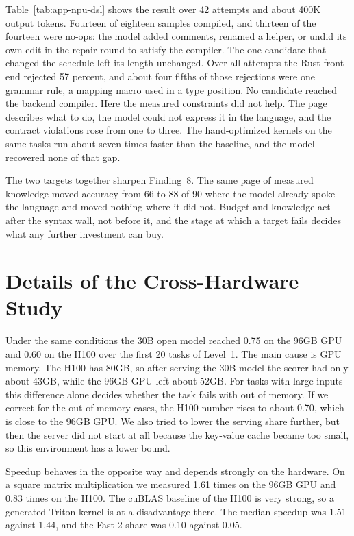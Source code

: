 Table~\ref{tab:app-npu-dsl} shows the result over 42 attempts and about 400K output tokens.
Fourteen of eighteen samples compiled, and thirteen of the fourteen were no-ops: the model added
comments, renamed a helper, or undid its own edit in the repair round to satisfy the compiler. The
one candidate that changed the schedule left its length unchanged. Over all attempts the Rust front
end rejected 57 percent, and about four fifths of those rejections were one grammar rule, a mapping
macro used in a type position. No candidate reached the backend compiler. Here the measured
constraints did not help. The page describes what to do, the model could not express it in the
language, and the contract violations rose from one to three. The hand-optimized kernels on the same
tasks run about seven times faster than the baseline, and the model recovered none of that gap.

The two targets together sharpen Finding~8. The same page of measured knowledge moved accuracy from
66 to 88 of 90 where the model already spoke the language and moved nothing where it did not. Budget
and knowledge act after the syntax wall, not before it, and the stage at which a target fails decides
what any further investment can buy.

\section{Details of the Cross-Hardware Study}

Under the same conditions the 30B open model reached 0.75 on the 96GB GPU and 0.60 on the H100 over
the first 20 tasks of Level~1. The main cause is GPU memory. The H100 has 80GB, so after serving the
30B model the scorer had only about 43GB, while the 96GB GPU left about 52GB. For tasks with large
inputs this difference alone decides whether the task fails with out of memory. If we correct for
the out-of-memory cases, the H100 number rises to about 0.70, which is close to the 96GB GPU. We
also tried to lower the serving share further, but then the server did not start at all because the
key-value cache became too small, so this environment has a lower bound.

Speedup behaves in the opposite way and depends strongly on the hardware. On a square matrix
multiplication we measured 1.61 times on the 96GB GPU and 0.83 times on the H100. The cuBLAS
baseline of the H100 is very strong, so a generated Triton kernel is at a disadvantage there. The
median speedup was 1.51 against 1.44, and the Fast-2 share was 0.10 against 0.05.

